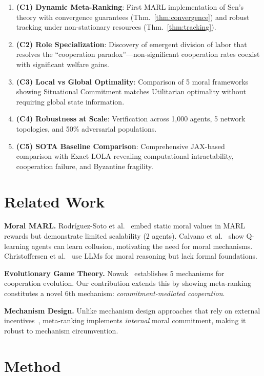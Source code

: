\documentclass{article}
\begin{document}
\begin{enumerate}
    \item \textbf{(C1) Dynamic Meta-Ranking}: First MARL implementation of Sen's theory with convergence guarantees (Thm.~\ref{thm:convergence}) and robust tracking under non-stationary resources (Thm.~\ref{thm:tracking}).
    \item \textbf{(C2) Role Specialization}: Discovery of emergent division of labor that resolves the ``cooperation paradox''---non-significant cooperation rates coexist with significant welfare gains.
    \item \textbf{(C3) Local vs Global Optimality}: Comparison of 5 moral frameworks showing Situational Commitment matches Utilitarian optimality without requiring global state information.
    \item \textbf{(C4) Robustness at Scale}: Verification across 1,000 agents, 5 network topologies, and 50\% adversarial populations.
    \item \textbf{(C5) SOTA Baseline Comparison}: Comprehensive JAX-based comparison with Exact LOLA revealing computational intractability, cooperation failure, and Byzantine fragility.
\end{enumerate}

\section{Related Work}

\textbf{Moral MARL.}
Rodr\'iguez-Soto et al.~\cite{rodriguez2021multi} embed static moral values in MARL rewards but demonstrate limited scalability (2 agents).
Calvano et al.~\cite{calvano2020artificial} show Q-learning agents can learn collusion, motivating the need for moral mechanisms.
Christoffersen et al.~\cite{christoffersen2023get} use LLMs for moral reasoning but lack formal foundations.

\textbf{Evolutionary Game Theory.}
Nowak~\cite{nowak2006evolutionary} establishes 5 mechanisms for cooperation evolution.
Our contribution extends this by showing meta-ranking constitutes a novel 6th mechanism: \textit{commitment-mediated cooperation}.

\textbf{Mechanism Design.}
Unlike mechanism design approaches that rely on external incentives~\cite{hurwicz1973design}, meta-ranking implements \textit{internal} moral commitment, making it robust to mechanism circumvention.

\section{Method}
\end{document}
